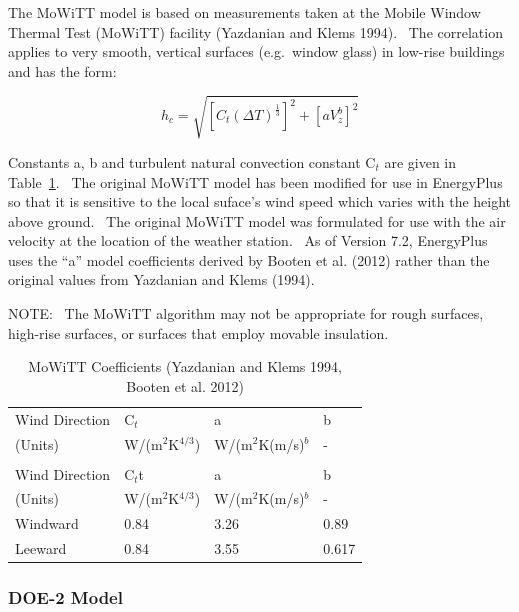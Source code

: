 The MoWiTT model is based on measurements taken at the Mobile Window Thermal Test (MoWiTT) facility (Yazdanian and Klems 1994).~ The correlation applies to very smooth, vertical surfaces (e.g.~window glass) in low-rise buildings and has the form:

\begin{equation}
{h_c} = \sqrt {{{\left[ {{C_t}{{\left( {\Delta T} \right)}^{\frac{1}{3}}}} \right]}^2} + {{\left[ {aV_z^b} \right]}^2}}
\end{equation}

Constants a, b and turbulent natural convection constant C\(_{t}\) are given in Table~\ref{table:mowitt-coefficients-yazdanian-and-klems-1994}.~ The original MoWiTT model has been modified for use in EnergyPlus so that it is sensitive to the local suface's wind speed which varies with the height above ground.~ The original MoWiTT model was formulated for use with the air velocity at the location of the weather station.~ As of Version 7.2, EnergyPlus uses the ``a'' model coefficients derived by Booten et al. (2012) rather than the original values from Yazdanian and Klems (1994).

NOTE:~ The MoWiTT algorithm may not be appropriate for rough surfaces, high-rise surfaces, or surfaces that employ movable insulation.

\begin{longtable}[c]{@{}llll@{}}
\caption{MoWiTT Coefficients (Yazdanian and Klems 1994, Booten et al. 2012) \label{table:mowitt-coefficients-yazdanian-and-klems-1994}} \tabularnewline
\toprule 
Wind Direction & C\(_t\) & a & b \tabularnewline
(Units) & W/(m\(^{2}\)K\(^{4/3}\)) & W/(m\(^{2}\)K(m/s)\(^{b}\) & - \tabularnewline
\midrule
\endfirsthead

\caption[]{MoWiTT Coefficients (Yazdanian and Klems 1994, Booten et al. 2012)} \tabularnewline
\toprule 
Wind Direction & C\(_t\)t & a & b \tabularnewline
(Units) & W/(m\(^{2}\)K\(^{4/3}\)) & W/(m\(^{2}\)K(m/s)\(^{b}\) & - \tabularnewline
\midrule
\endhead

Windward & 0.84 & 3.26 & 0.89 \tabularnewline
Leeward & 0.84 & 3.55 & 0.617 \tabularnewline
\bottomrule
\end{longtable}

\subsubsection{DOE-2 Model}\label{doe-2-model}

